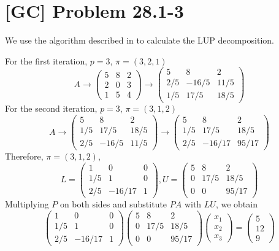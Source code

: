 \documentclass[a4paper,11pt]{article}
\begin{document}
  \section{[GC] Problem 28.1-3}
  We use the algorithm described in  to calculate the LUP decomposition. \par
  For the first iteration, $p = 3$, $\pi = (3, 2, 1)$
  $$ A \rightarrow
       \begin{pmatrix}
           5 & 8 & 2 \\
           2 & 0 & 3 \\
           1 & 5 & 4
       \end{pmatrix}
       \rightarrow
       \begin{pmatrix}
           5 & 8 & 2 \\
           2/5 & -16/5 & 11/5 \\
           1/5 & 17/5 & 18/5
       \end{pmatrix} $$
  For the second iteration, $p = 3$, $\pi = (3, 1, 2)$
  $$
   A \rightarrow
       \begin{pmatrix}
           5 & 8 & 2 \\
           1/5 & 17/5 & 18/5 \\
           2/5 & -16/5 & 11/5
       \end{pmatrix}
     \rightarrow
       \begin{pmatrix}
           5 & 8 & 2 \\
           1/5 & 17/5 & 18/5 \\
           2/5 & -16/17 & 95/17
       \end{pmatrix}
  $$
  Therefore, $\pi = (3, 1, 2)$,
  $$ L = \begin{pmatrix}
           1 & 0 & 0 \\
           1/5 & 1 & 0 \\
           2/5 & -16/17 & 1
         \end{pmatrix} ,
   U = \begin{pmatrix}
           5 & 8 & 2 \\
           0 & 17/5 & 18/5 \\
           0 & 0 & 95/17
       \end{pmatrix} $$
  Multiplying $P$ on both sides and substitute $PA$ with $LU$, we obtain
  $$ \begin{pmatrix}
       1 & 0 & 0 \\
       1/5 & 1 & 0 \\
       2/5 & -16/17 & 1
     \end{pmatrix}
     \begin{pmatrix}
       5 & 8 & 2 \\
       0 & 17/5 & 18/5 \\
       0 & 0 & 95/17
     \end{pmatrix}
     \begin{pmatrix} x_1 \\ x_2 \\ x_3 \end{pmatrix}
     =
     \begin{pmatrix} 5 \\ 12 \\ 9 \end{pmatrix} $$
\end{document}
